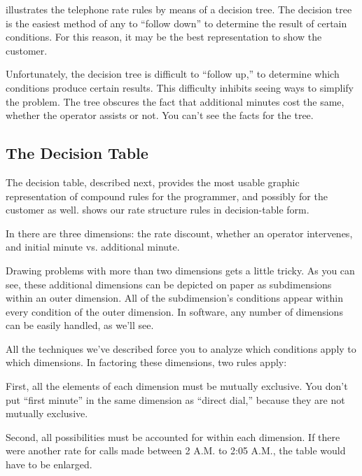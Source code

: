  illustrates the telephone rate rules by means of a
decision tree.  The decision tree is the easiest method of any to
``follow down'' to determine the result of certain conditions. For
this reason, it may be the best representation to show the customer.

Unfortunately, the decision tree is difficult to ``follow up,'' to
determine which conditions produce certain results. This difficulty
inhibits seeing ways to simplify the problem. The tree obscures the
fact that additional minutes cost the same, whether the operator
assists or not. You can't see the facts for the tree.



\subsection{The Decision Table}

The decision table, described next, provides the most usable graphic
representation of compound rules for the programmer, and possibly for
the customer as well.  shows our rate structure rules in
decision-table form.


In  there are three dimensions: the rate discount, whether
an operator intervenes, and initial minute vs. additional minute.

Drawing problems with more than two dimensions gets a little tricky.
As you can see, these additional dimensions can be depicted on
paper as subdimensions within an outer dimension. All of the
subdimension's conditions appear within every condition of the outer
dimension.  In software, any number of dimensions can be easily
handled, as we'll see.

All the techniques we've described force you to analyze which
conditions apply to which dimensions. In factoring these dimensions,
two rules apply:

First, all the elements of each dimension must be mutually exclusive.
You don't put ``first minute'' in the same dimension as ``direct
dial,'' because they are not mutually exclusive.

Second, all possibilities must be accounted for within each dimension.
If there were another rate for calls made between 2 A.M. to 2:05 A.M.,
the table would have to be enlarged.

